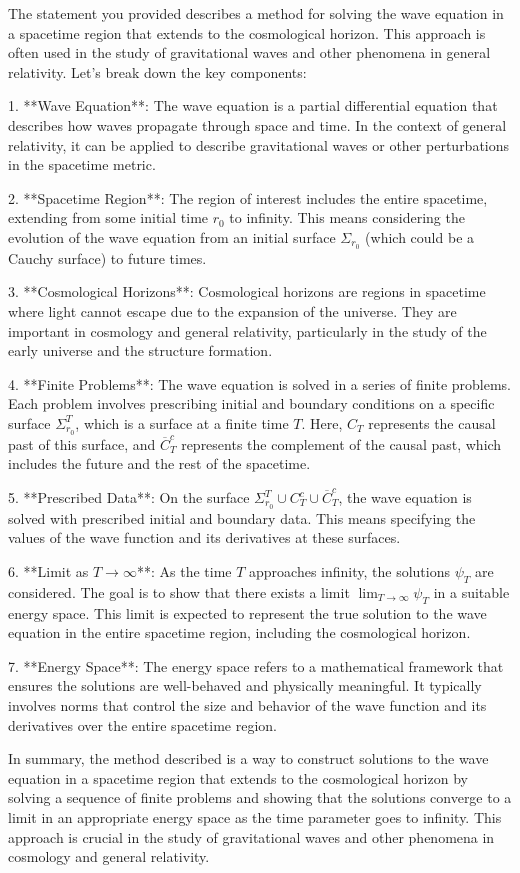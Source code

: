 The statement you provided describes a method for solving the wave equation in a spacetime region that extends to the cosmological horizon. This approach is often used in the study of gravitational waves and other phenomena in general relativity. Let's break down the key components:

1. **Wave Equation**: The wave equation is a partial differential equation that describes how waves propagate through space and time. In the context of general relativity, it can be applied to describe gravitational waves or other perturbations in the spacetime metric.

2. **Spacetime Region**: The region of interest includes the entire spacetime, extending from some initial time \( r_0 \) to infinity. This means considering the evolution of the wave equation from an initial surface \( \Sigma_{r_0} \) (which could be a Cauchy surface) to future times.

3. **Cosmological Horizons**: Cosmological horizons are regions in spacetime where light cannot escape due to the expansion of the universe. They are important in cosmology and general relativity, particularly in the study of the early universe and the structure formation.

4. **Finite Problems**: The wave equation is solved in a series of finite problems. Each problem involves prescribing initial and boundary conditions on a specific surface \( \Sigma_{r_0}^T \), which is a surface at a finite time \( T \). Here, \( C_T \) represents the causal past of this surface, and \( \overline{C}_T^c \) represents the complement of the causal past, which includes the future and the rest of the spacetime.

5. **Prescribed Data**: On the surface \( \Sigma_{r_0}^T \cup C_T^c \cup \overline{C}_T^c \), the wave equation is solved with prescribed initial and boundary data. This means specifying the values of the wave function and its derivatives at these surfaces.

6. **Limit as \( T \to \infty \)**: As the time \( T \) approaches infinity, the solutions \( \psi_T \) are considered. The goal is to show that there exists a limit \( \lim_{T \to \infty} \psi_T \) in a suitable energy space. This limit is expected to represent the true solution to the wave equation in the entire spacetime region, including the cosmological horizon.

7. **Energy Space**: The energy space refers to a mathematical framework that ensures the solutions are well-behaved and physically meaningful. It typically involves norms that control the size and behavior of the wave function and its derivatives over the entire spacetime region.

In summary, the method described is a way to construct solutions to the wave equation in a spacetime region that extends to the cosmological horizon by solving a sequence of finite problems and showing that the solutions converge to a limit in an appropriate energy space as the time parameter goes to infinity. This approach is crucial in the study of gravitational waves and other phenomena in cosmology and general relativity.